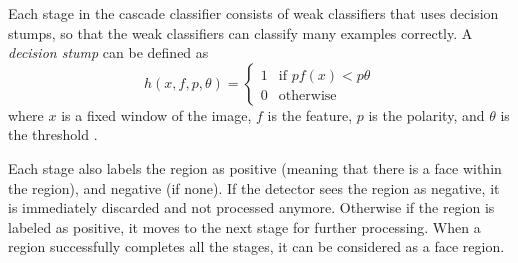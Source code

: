 Each stage in the cascade classifier consists of weak classifiers that uses decision stumps, so that the weak classifiers can classify many examples correctly. A \textit{decision stump} can be defined as
\[h \left(x, f, p, \theta \right) = \begin{cases}1 & \text{if } pf(x) < p\theta\\ 0 & \text{otherwise}\end{cases}
\]
where $x$ is a fixed window of the image, $f$ is the feature, $p$ is the polarity, and $\theta$ is the threshold \cite{viola_robust_2004}.

Each stage also labels the region as positive (meaning that there is a face within the region), and negative (if none). If the detector sees the region as negative, it is immediately discarded and not processed anymore. Otherwise if the region is labeled as positive, it moves to the next stage for further processing. When a region successfully completes all the stages, it can be considered as a face region.
